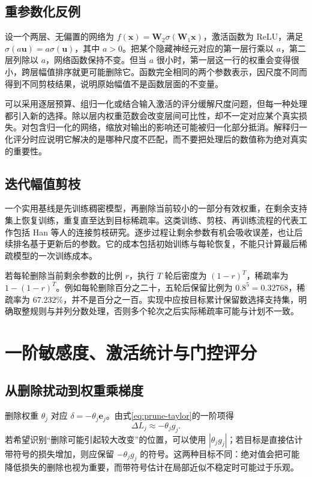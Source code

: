 \documentclass[UTF8,12pt,a4paper,fontset=fandol]{ctexart}
\begin{document}
\subsection{重参数化反例}
设一个两层、无偏置的网络为 $f(\mathbf x)=\mathbf W_2\sigma(\mathbf W_1\mathbf x)$，激活函数为 ReLU，满足 $\sigma(a\mathbf u)=a\sigma(\mathbf u)$，其中 $a>0$。把某个隐藏神经元对应的第一层行乘以 $a$，第二层列除以 $a$，网络函数保持不变。但当 $a$ 很小时，第一层这一行的权重会变得很小，跨层幅值排序就更可能删除它。函数完全相同的两个参数表示，因尺度不同而得到不同剪枝结果，说明原始幅值不是函数层面的不变量。

可以采用逐层预算、组归一化或结合输入激活的评分缓解尺度问题，但每一种处理都引入新的选择。除以层内权重范数会改变层间可比性，却不一定对应某个真实损失。对包含归一化的网络，缩放对输出的影响还可能被归一化部分抵消。解释归一化评分时应说明它解决的是哪种尺度不匹配，而不要把处理后的数值称为绝对真实的重要性。

\subsection{迭代幅值剪枝}
一个实用基线是先训练稠密模型，再删除当前较小的一部分有效权重，在剩余支持集上恢复训练，重复直至达到目标稀疏率。这类训练、剪枝、再训练流程的代表工作包括 Han 等人的连接剪枝研究\cite{han2015}。逐步过程让剩余参数有机会吸收误差，也让后续排名基于更新后的参数。它的成本包括初始训练与每轮恢复，不能只计算最后稀疏模型的一次训练成本。

若每轮删除当前剩余参数的比例 $r$，执行 $T$ 轮后密度为 $(1-r)^T$，稀疏率为 $1-(1-r)^T$。例如每轮删除百分之二十，五轮后保留比例为 $0.8^5=0.32768$，稀疏率为 $67.232\%$，并不是百分之一百。实现中应按目标累计保留数选择支持集，明确取整规则与并列分数处理，否则多个轮次之后实际稀疏率可能与计划不一致。

\section{一阶敏感度、激活统计与门控评分}
\label{sec:prune-first-order}

\subsection{从删除扰动到权重乘梯度}
删除权重 $\theta_j$ 对应 $\delta=-\theta_j\mathbf e_j$。由式\eqref{eq:prune-taylor}的一阶项得
\begin{equation}
 \Delta L_j\approx-\theta_jg_j.
 \label{eq:prune-first-score}
\end{equation}
若希望识别“删除可能引起较大改变”的位置，可以使用 $|\theta_jg_j|$；若目标是直接估计带符号的损失增加，则应保留 $-\theta_jg_j$ 的符号。这两种目标不同：绝对值会把可能降低损失的删除也视为重要，而带符号估计在局部近似不稳定时可能过于乐观。
\end{document}
